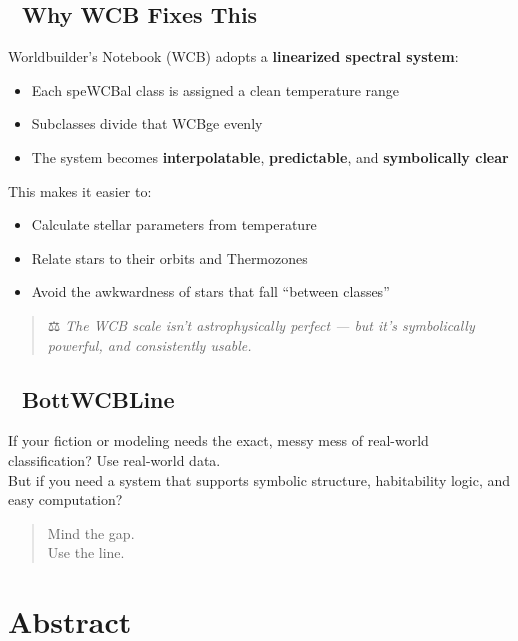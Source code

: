 \documentclass[
  letterpaper,
]{book}
\providecommand{\tightlist}{%
  \setlength{\itemsep}{0pt}\setlength{\parskip}{0pt}}
\begin{document}
\section{🧭 Why WCB Fixes This}\label{why-wcb-fixes-this}

Worldbuilder's Notebook (WCB) adopts a \textbf{linearized spectral
system}:

\begin{itemize}
\tightlist
\item
  Each speWCBal class is assigned a clean temperature range
\item
  Subclasses divide that WCBge evenly
\item
  The system becomes \textbf{interpolatable}, \textbf{predictable}, and
  \textbf{symbolically clear}
\end{itemize}

This makes it easier to:

\begin{itemize}
\tightlist
\item
  Calculate stellar parameters from temperature
\item
  Relate stars to their orbits and Thermozones
\item
  Avoid the awkwardness of stars that fall ``between classes''
\end{itemize}

\begin{quote}
⚖️ \emph{The WCB scale isn't astrophysically perfect --- but it's
symbolically powerful, and consistently usable.}
\end{quote}

\section{📌 BottWCBLine}\label{bottwcbline}

If your fiction or modeling needs the exact, messy mess of real-world
classification? Use real-world data.\\
But if you need a system that supports symbolic structure, habitability
logic, and easy computation?

\begin{quote}
Mind the gap.\\
Use the line.
\end{quote}

\chapter{Abstract}\label{abstract-17}
\end{document}
